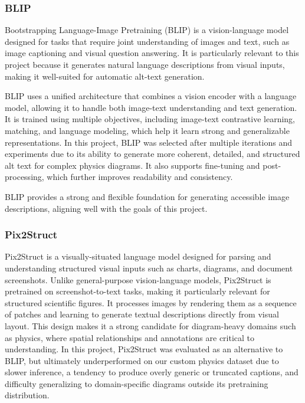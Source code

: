 \documentclass[11pt]{article}
\begin{document}
\subsubsection{BLIP}
Bootstrapping Language-Image Pretraining (BLIP) is a vision-language model designed for tasks that require joint understanding of images and text, such as image captioning and visual question answering. 
It is particularly relevant to this project because it generates natural language descriptions from visual inputs, making it well-suited for automatic alt-text generation.

BLIP uses a unified architecture that combines a vision encoder with a language model, allowing it to handle both image-text understanding and text generation. It is trained using multiple objectives, 
including image-text contrastive learning, matching, and language modeling, which help it learn strong and generalizable representations.
In this project, BLIP was selected after multiple iterations and experiments due to its ability to generate more coherent, detailed, and structured alt text for complex physics diagrams. It also 
supports fine-tuning and post-processing, which further improves readability and consistency.

BLIP provides a strong and flexible foundation for generating accessible image descriptions, aligning well with the goals of this project.

\subsubsection{Pix2Struct}
Pix2Struct is a visually-situated language model designed for parsing and understanding 
structured visual inputs such as charts, diagrams, and document screenshots. Unlike 
general-purpose vision-language models, Pix2Struct is pretrained on screenshot-to-text 
tasks, making it particularly relevant for structured scientific figures. It processes 
images by rendering them as a sequence of patches and learning to generate textual 
descriptions directly from visual layout. This design makes it a strong candidate for 
diagram-heavy domains such as physics, where spatial relationships and annotations are 
critical to understanding. In this project, Pix2Struct was evaluated as an alternative 
to BLIP, but ultimately underperformed on our custom physics dataset due to slower 
inference, a tendency to produce overly generic or truncated captions, and difficulty 
generalizing to domain-specific diagrams outside its pretraining distribution.
\end{document}
